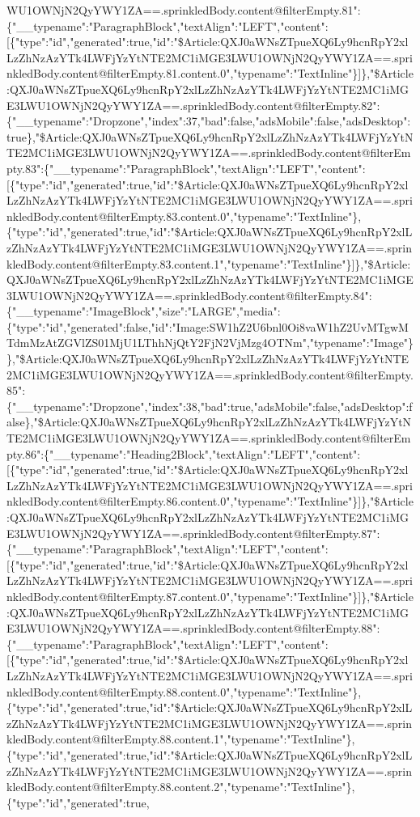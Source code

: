 WU1OWNjN2QyYWY1ZA==.sprinkledBody.content@filterEmpty.81":\{"\_\_typename":"ParagraphBlock","textAlign":"LEFT","content":{[}\{"type":"id","generated":true,"id":"\$Article:QXJ0aWNsZTpueXQ6Ly9hcnRpY2xlLzZhNzAzYTk4LWFjYzYtNTE2MC1iMGE3LWU1OWNjN2QyYWY1ZA==.sprinkledBody.content@filterEmpty.81.content.0","typename":"TextInline"\}{]}\},"\$Article:QXJ0aWNsZTpueXQ6Ly9hcnRpY2xlLzZhNzAzYTk4LWFjYzYtNTE2MC1iMGE3LWU1OWNjN2QyYWY1ZA==.sprinkledBody.content@filterEmpty.82":\{"\_\_typename":"Dropzone","index":37,"bad":false,"adsMobile":false,"adsDesktop":true\},"\$Article:QXJ0aWNsZTpueXQ6Ly9hcnRpY2xlLzZhNzAzYTk4LWFjYzYtNTE2MC1iMGE3LWU1OWNjN2QyYWY1ZA==.sprinkledBody.content@filterEmpty.83":\{"\_\_typename":"ParagraphBlock","textAlign":"LEFT","content":{[}\{"type":"id","generated":true,"id":"\$Article:QXJ0aWNsZTpueXQ6Ly9hcnRpY2xlLzZhNzAzYTk4LWFjYzYtNTE2MC1iMGE3LWU1OWNjN2QyYWY1ZA==.sprinkledBody.content@filterEmpty.83.content.0","typename":"TextInline"\},\{"type":"id","generated":true,"id":"\$Article:QXJ0aWNsZTpueXQ6Ly9hcnRpY2xlLzZhNzAzYTk4LWFjYzYtNTE2MC1iMGE3LWU1OWNjN2QyYWY1ZA==.sprinkledBody.content@filterEmpty.83.content.1","typename":"TextInline"\}{]}\},"\$Article:QXJ0aWNsZTpueXQ6Ly9hcnRpY2xlLzZhNzAzYTk4LWFjYzYtNTE2MC1iMGE3LWU1OWNjN2QyYWY1ZA==.sprinkledBody.content@filterEmpty.84":\{"\_\_typename":"ImageBlock","size":"LARGE","media":\{"type":"id","generated":false,"id":"Image:SW1hZ2U6bnl0Oi8vaW1hZ2UvMTgwMTdmMzAtZGVlZS01MjU1LThhNjQtY2FjN2VjMzg4OTNm","typename":"Image"\}\},"\$Article:QXJ0aWNsZTpueXQ6Ly9hcnRpY2xlLzZhNzAzYTk4LWFjYzYtNTE2MC1iMGE3LWU1OWNjN2QyYWY1ZA==.sprinkledBody.content@filterEmpty.85":\{"\_\_typename":"Dropzone","index":38,"bad":true,"adsMobile":false,"adsDesktop":false\},"\$Article:QXJ0aWNsZTpueXQ6Ly9hcnRpY2xlLzZhNzAzYTk4LWFjYzYtNTE2MC1iMGE3LWU1OWNjN2QyYWY1ZA==.sprinkledBody.content@filterEmpty.86":\{"\_\_typename":"Heading2Block","textAlign":"LEFT","content":{[}\{"type":"id","generated":true,"id":"\$Article:QXJ0aWNsZTpueXQ6Ly9hcnRpY2xlLzZhNzAzYTk4LWFjYzYtNTE2MC1iMGE3LWU1OWNjN2QyYWY1ZA==.sprinkledBody.content@filterEmpty.86.content.0","typename":"TextInline"\}{]}\},"\$Article:QXJ0aWNsZTpueXQ6Ly9hcnRpY2xlLzZhNzAzYTk4LWFjYzYtNTE2MC1iMGE3LWU1OWNjN2QyYWY1ZA==.sprinkledBody.content@filterEmpty.87":\{"\_\_typename":"ParagraphBlock","textAlign":"LEFT","content":{[}\{"type":"id","generated":true,"id":"\$Article:QXJ0aWNsZTpueXQ6Ly9hcnRpY2xlLzZhNzAzYTk4LWFjYzYtNTE2MC1iMGE3LWU1OWNjN2QyYWY1ZA==.sprinkledBody.content@filterEmpty.87.content.0","typename":"TextInline"\}{]}\},"\$Article:QXJ0aWNsZTpueXQ6Ly9hcnRpY2xlLzZhNzAzYTk4LWFjYzYtNTE2MC1iMGE3LWU1OWNjN2QyYWY1ZA==.sprinkledBody.content@filterEmpty.88":\{"\_\_typename":"ParagraphBlock","textAlign":"LEFT","content":{[}\{"type":"id","generated":true,"id":"\$Article:QXJ0aWNsZTpueXQ6Ly9hcnRpY2xlLzZhNzAzYTk4LWFjYzYtNTE2MC1iMGE3LWU1OWNjN2QyYWY1ZA==.sprinkledBody.content@filterEmpty.88.content.0","typename":"TextInline"\},\{"type":"id","generated":true,"id":"\$Article:QXJ0aWNsZTpueXQ6Ly9hcnRpY2xlLzZhNzAzYTk4LWFjYzYtNTE2MC1iMGE3LWU1OWNjN2QyYWY1ZA==.sprinkledBody.content@filterEmpty.88.content.1","typename":"TextInline"\},\{"type":"id","generated":true,"id":"\$Article:QXJ0aWNsZTpueXQ6Ly9hcnRpY2xlLzZhNzAzYTk4LWFjYzYtNTE2MC1iMGE3LWU1OWNjN2QyYWY1ZA==.sprinkledBody.content@filterEmpty.88.content.2","typename":"TextInline"\},\{"type":"id","generated":true,